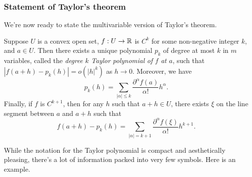 \subsubsection*{Statement of Taylor's theorem}

We're now ready to state the multivariable version of Taylor's theorem. 

\begin{theorem}[Taylor] \label{taylor}
	Suppose $U$ is a convex open set, $f : U \to \mathbb{R}$ is $C^k$ for some non-negative integer $k$, and $a \in U$. Then there exists a unique polynomial $p_k$ of degree at most $k$ in $m$ variables, called the \emph{degree $k$ Taylor polynomial of $f$ at $a$}, such that $|f(a+h) - p_k(h)| = o(|h|^k)$ as $h \to 0$. Moreover, we have
	\begin{equation} \label{taylor-polynomial} p_k(h) = \sum_{|\alpha| \leq k} \frac{\partial^\alpha f(a)}{\alpha!} h^\alpha. \end{equation}
	Finally, if $f$ is $C^{k+1}$, then for any $h$ such that $a + h \in U$, there exists $\xi$ on the line segment between $a$ and $a+h$ such that 
	\[ f(a+h) - p_k(h) = \sum_{|\alpha| = k+1} \frac{\partial^\alpha f(\xi)}{\alpha!} h^{k+1}. \]
\end{theorem}

While the notation for the Taylor polynomial is compact and aesthetically pleasing, there's a lot of information packed into very few symbols. Here is an example. 

